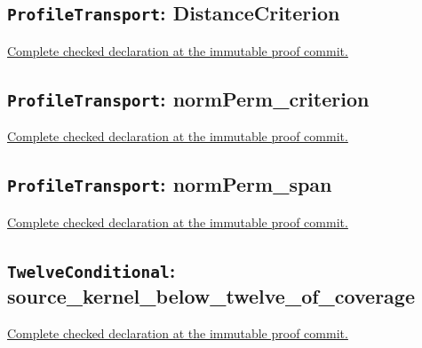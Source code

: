 \subsection*{\texttt{ProfileTransport}: DistanceCriterion}

\noindent\href{https://github.com/alectionary/vibe-math/blob/3ae21c0719cedbd928f4f7882f9b9e266567605e/formalization/distance-preservation/truncated12/ProfileTransport.lean#L9-L17}{Complete checked declaration at the immutable proof commit.}



\subsection*{\texttt{ProfileTransport}: normPerm\_criterion}

\noindent\href{https://github.com/alectionary/vibe-math/blob/3ae21c0719cedbd928f4f7882f9b9e266567605e/formalization/distance-preservation/truncated12/ProfileTransport.lean#L30-L43}{Complete checked declaration at the immutable proof commit.}



\subsection*{\texttt{ProfileTransport}: normPerm\_span}

\noindent\href{https://github.com/alectionary/vibe-math/blob/3ae21c0719cedbd928f4f7882f9b9e266567605e/formalization/distance-preservation/truncated12/ProfileTransport.lean#L56-L64}{Complete checked declaration at the immutable proof commit.}



\subsection*{\texttt{TwelveConditional}: source\_kernel\_below\_twelve\_of\_coverage}

\noindent\href{https://github.com/alectionary/vibe-math/blob/3ae21c0719cedbd928f4f7882f9b9e266567605e/formalization/distance-preservation/truncated12/TwelveConditional.lean#L13-L133}{Complete checked declaration at the immutable proof commit.}



